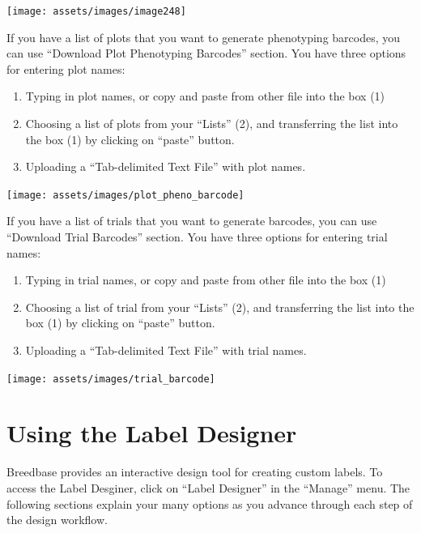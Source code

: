 \documentclass[
  12pt,
]{book}
\begin{document}
\begin{center}\texttt{[image: assets/images/image248]} \end{center}

If you have a list of plots that you want to generate phenotyping barcodes, you can use ``Download Plot Phenotyping Barcodes'' section. You have three options for entering plot names:

\begin{enumerate}
\def\labelenumi{\arabic{enumi}.}
\item
  Typing in plot names, or copy and paste from other file into the box (1)
\item
  Choosing a list of plots from your ``Lists'' (2), and transferring the list into the box (1) by clicking on ``paste'' button.
\item
  Uploading a ``Tab-delimited Text File'' with plot names.
\end{enumerate}

\begin{center}\texttt{[image: assets/images/plot\_pheno\_barcode]} \end{center}

If you have a list of trials that you want to generate barcodes, you can use ``Download Trial Barcodes'' section. You have three options for entering trial names:

\begin{enumerate}
\def\labelenumi{\arabic{enumi}.}
\item
  Typing in trial names, or copy and paste from other file into the box (1)
\item
  Choosing a list of trial from your ``Lists'' (2), and transferring the list into the box (1) by clicking on ``paste'' button.
\item
  Uploading a ``Tab-delimited Text File'' with trial names.
\end{enumerate}

\begin{center}\texttt{[image: assets/images/trial\_barcode]} \end{center}

\hypertarget{using-the-label-designer}{%
\chapter{Using the Label Designer}\label{using-the-label-designer}}

Breedbase provides an interactive design tool for creating custom labels. To access the Label Desginer, click on ``Label Designer'' in the ``Manage'' menu. The following sections explain your many options as you advance through each step of the design workflow.
\end{document}
